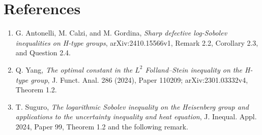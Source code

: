 \documentclass[11pt]{article}
\begin{document}
\section*{References}

\begin{enumerate}
\item G. Antonelli, M. Calzi, and M. Gordina,
  \emph{Sharp defective log-Sobolev inequalities on H-type groups},
  arXiv:2410.15566v1, Remark 2.2, Corollary 2.3, and Question 2.4.
\item Q. Yang, \emph{The optimal constant in the $L^2$ Folland--Stein
  inequality on the H-type group}, J. Funct. Anal. 286 (2024), Paper 110209;
  arXiv:2301.03332v4, Theorem 1.2.
\item T. Suguro, \emph{The logarithmic Sobolev inequality on the Heisenberg
  group and applications to the uncertainty inequality and heat equation},
  J. Inequal. Appl. 2024, Paper 99, Theorem 1.2 and the following remark.
\end{enumerate}
\end{document}
